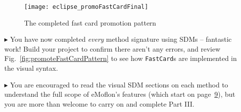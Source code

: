 \begin{itemize}
\begin{figure}[htp]
\begin{center}
  \texttt{[image: eclipse\_promoFastCardFinal]}
  \caption{The completed fast card promotion pattern}
  \label{fig:promoFastCardFinal}
\end{center}
\end{figure}

\vspace{0.5cm}

\item[$\blacktriangleright$] You have now completed \emph{every} method signature using SDMs -- fantastic work! Build your project to
confirm there aren't any errors, and review Fig.~\ref{fig:promoteFastCardPattern} to see how \texttt{FastCard}s are implemented in the visual syntax.

\item[$\blacktriangleright$] You are encouraged to read the visual SDM sections on each method to understand the full scope of eMoflon's features (which start
on page~\hyperlink{Page.9}{9}), but you are more than welcome to carry on and complete Part III.
  
\end{itemize}
